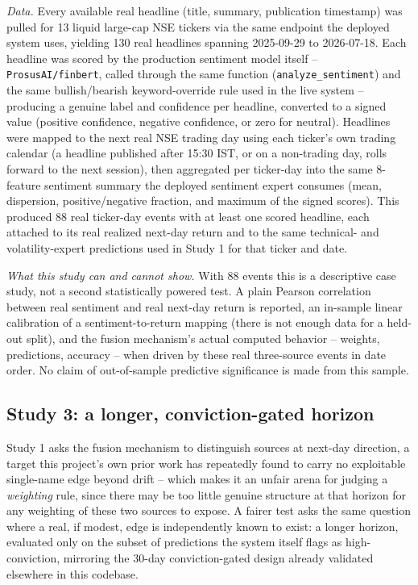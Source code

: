 \documentclass[10pt,a4paper,twocolumn]{article}
\begin{document}
\textit{Data.} Every available real headline (title, summary, publication timestamp) was pulled for 13 liquid large-cap NSE tickers via the same endpoint the deployed system uses, yielding 130 real headlines spanning 2025-09-29 to 2026-07-18. Each headline was scored by the production sentiment model itself -- \texttt{ProsusAI/finbert}, called through the same function (\texttt{analyze\_sentiment}) and the same bullish/bearish keyword-override rule used in the live system -- producing a genuine label and confidence per headline, converted to a signed value (positive confidence, negative confidence, or zero for neutral). Headlines were mapped to the next real NSE trading day using each ticker's own trading calendar (a headline published after 15:30 IST, or on a non-trading day, rolls forward to the next session), then aggregated per ticker-day into the same 8-feature sentiment summary the deployed sentiment expert consumes (mean, dispersion, positive/negative fraction, and maximum of the signed scores). This produced 88 real ticker-day events with at least one scored headline, each attached to its real realized next-day return and to the same technical- and volatility-expert predictions used in Study 1 for that ticker and date.

\textit{What this study can and cannot show.} With 88 events this is a descriptive case study, not a second statistically powered test. A plain Pearson correlation between real sentiment and real next-day return is reported, an in-sample linear calibration of a sentiment-to-return mapping (there is not enough data for a held-out split), and the fusion mechanism's actual computed behavior -- weights, predictions, accuracy -- when driven by these real three-source events in date order. No claim of out-of-sample predictive significance is made from this sample.

\subsection{Study 3: a longer, conviction-gated horizon}

Study 1 asks the fusion mechanism to distinguish sources at next-day direction, a target this project's own prior work has repeatedly found to carry no exploitable single-name edge beyond drift -- which makes it an unfair arena for judging a \emph{weighting} rule, since there may be too little genuine structure at that horizon for any weighting of these two sources to expose. A fairer test asks the same question where a real, if modest, edge is independently known to exist: a longer horizon, evaluated only on the subset of predictions the system itself flags as high-conviction, mirroring the 30-day conviction-gated design already validated elsewhere in this codebase.
\end{document}
